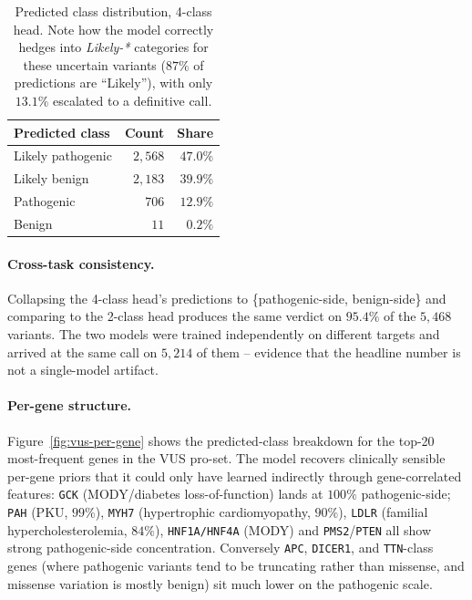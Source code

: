 \documentclass[11pt,a4paper]{article}
\begin{document}
\begin{table}[H]
\centering
\caption{Predicted class distribution, 4-class head. Note how the model
correctly hedges into \emph{Likely-*} categories for these uncertain
variants ($87\%$ of predictions are ``Likely''), with only $13.1\%$
escalated to a definitive call.}
\label{tab:vus-dist-4class}
\small
\begin{tabular}{lrr}
\toprule
Predicted class & Count & Share \\
\midrule
Likely pathogenic & $2{,}568$ & $47.0\%$ \\
Likely benign & $2{,}183$ & $39.9\%$ \\
Pathogenic & $706$ & $12.9\%$ \\
Benign & $11$ & $0.2\%$ \\
\bottomrule
\end{tabular}
\end{table}

\paragraph{Cross-task consistency.}
Collapsing the 4-class head's predictions to \{pathogenic-side,
benign-side\} and comparing to the 2-class head produces the same verdict
on $95.4\%$ of the $5{,}468$ variants. The two models were trained
independently on different targets and arrived at the same call on
$5{,}214$ of them -- evidence that the headline number is not a
single-model artifact.

\paragraph{Per-gene structure.}
Figure~\ref{fig:vus-per-gene} shows the predicted-class breakdown for the
top-20 most-frequent genes in the VUS pro-set. The model recovers
clinically sensible per-gene priors that it could only have learned
indirectly through gene-correlated features: \texttt{GCK} (MODY/diabetes
loss-of-function) lands at $100\%$ pathogenic-side; \texttt{PAH} (PKU,
$99\%$), \texttt{MYH7} (hypertrophic cardiomyopathy, $90\%$),
\texttt{LDLR} (familial hypercholesterolemia, $84\%$),
\texttt{HNF1A/HNF4A} (MODY) and \texttt{PMS2}/\texttt{PTEN} all show
strong pathogenic-side concentration. Conversely \texttt{APC},
\texttt{DICER1}, and \texttt{TTN}-class genes (where pathogenic variants
tend to be truncating rather than missense, and missense variation is
mostly benign) sit much lower on the pathogenic scale.
\end{document}
